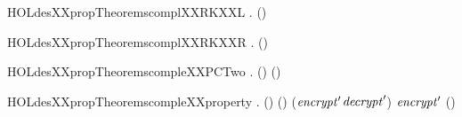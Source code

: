 \newcommand{\HOLdesXXpropTheoremscomplXXjoin}{\UseVerbatim{HOLdesXXpropTheoremscomplXXjoin}}
\begin{SaveVerbatim}{HOLdesXXpropTheoremscomplXXRKXXL}
\HOLTokenTurnstile{} \HOLSymConst{\HOLTokenForall{}} .  \HOLSymConst{\HOLTokenGt{}}  \HOLSymConst{\HOLTokenImp{}}   (\HOLSymConst{\HOLTokenNeg{}}) \HOLSymConst{=} \HOLSymConst{\HOLTokenNeg{}}  
\end{SaveVerbatim}
\newcommand{\HOLdesXXpropTheoremscomplXXRKXXL}{\UseVerbatim{HOLdesXXpropTheoremscomplXXRKXXL}}
\begin{SaveVerbatim}{HOLdesXXpropTheoremscomplXXRKXXR}
\HOLTokenTurnstile{} \HOLSymConst{\HOLTokenForall{}} .  \HOLSymConst{\HOLTokenGt{}}  \HOLSymConst{\HOLTokenImp{}}   (\HOLSymConst{\HOLTokenNeg{}}) \HOLSymConst{=} \HOLSymConst{\HOLTokenNeg{}}  
\end{SaveVerbatim}
\newcommand{\HOLdesXXpropTheoremscomplXXRKXXR}{\UseVerbatim{HOLdesXXpropTheoremscomplXXRKXXR}}
\begin{SaveVerbatim}{HOLdesXXpropTheoremscompleXXPCTwo}
\HOLTokenTurnstile{} \HOLSymConst{\HOLTokenForall{}} .  (\HOLSymConst{\HOLTokenNeg{}}\HOLSymConst{,}\HOLSymConst{\HOLTokenNeg{}}) \HOLSymConst{=} \HOLSymConst{\HOLTokenNeg{}} (\HOLSymConst{,})
\end{SaveVerbatim}
\newcommand{\HOLdesXXpropTheoremscompleXXPCTwo}{\UseVerbatim{HOLdesXXpropTheoremscompleXXPCTwo}}
\begin{SaveVerbatim}{HOLdesXXpropTheoremscompleXXproperty}
\HOLTokenTurnstile{} \HOLSymConst{\HOLTokenForall{}}  .
      \HOLSymConst{\HOLTokenLt{}}  \HOLSymConst{\HOLTokenConj{}}  \HOLSymConst{\HOLTokenLt{}}  \HOLSymConst{\HOLTokenConj{}}    \HOLSymConst{=} (\HOLSymConst{,}) \HOLSymConst{\HOLTokenConj{}}
       (\HOLSymConst{\HOLTokenNeg{}}) \HOLSymConst{=} (\ensuremath{\HOLFreeVar{encrypt}\sp{\prime{}}}\HOLSymConst{,}\ensuremath{\HOLFreeVar{decrypt}\sp{\prime{}}}) \HOLSymConst{\HOLTokenImp{}}
     \HOLSymConst{\HOLTokenNeg{}}  \HOLSymConst{=} \ensuremath{\HOLFreeVar{encrypt}\sp{\prime{}}} (\HOLSymConst{\HOLTokenNeg{}})
\end{SaveVerbatim}
